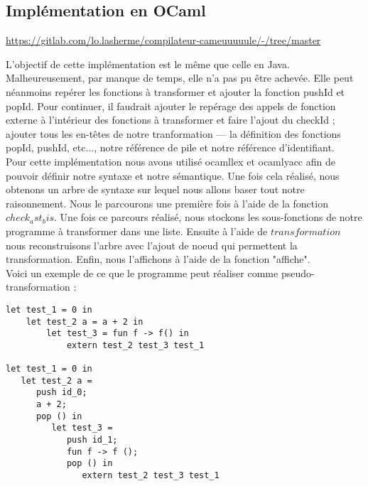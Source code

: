 \documentclass[11pt, a4paper, notitlepage]{article}
\newcommand\tab{{\hspace*{12.5mm}}}
\begin{document}
\subsection{Implémentation en OCaml}
\begin{center}
   \url{https://gitlab.com/lo.lasherme/compilateur-cameuuuuule/-/tree/master}
\end{center}

\tab L'objectif de cette implémentation est le même que celle en Java. Malheureusement, par manque de temps, elle n'a pas pu être achevée. Elle peut néanmoins repérer les fonctions à transformer et ajouter la fonction pushId et popId. Pour continuer, il faudrait ajouter le repérage des appels de fonction externe à l'intérieur des fonctions à transformer et faire l'ajout du checkId ; ajouter tous les en-têtes de notre tranformation --- la définition des fonctions popId, pushId, etc..., notre référence de pile et notre référence d'identifiant.\\
\tab Pour cette implémentation nous avons utilisé ocamllex et ocamlyacc afin de pouvoir définir notre syntaxe et notre sémantique. Une fois cela réalisé, nous obtenons un arbre de syntaxe sur lequel nous allons baser tout notre raisonnement. Nous le parcourons une première fois à l'aide de la fonction $check_ast_bis$. Une fois ce parcours réalisé, nous stockons les sous-fonctions de notre programme à transformer dans une liste. Ensuite à l'aide de $transformation$ nous reconstruisons l'arbre avec l'ajout de noeud qui permettent la transformation. Enfin, nous l'affichons à l'aide de la fonction "affiche".\\
\tab Voici un exemple de ce que le programme peut réaliser comme pseudo-transformation :
\begin{lstlisting}[language=caml]
let test_1 = 0 in
	let test_2 a = a + 2 in
		let test_3 = fun f -> f() in
			extern test_2 test_3 test_1

let test_1 = 0 in
   let test_2 a =
      push id_0;
      a + 2;
      pop () in
         let test_3 =
            push id_1;
            fun f -> f ();
            pop () in
               extern test_2 test_3 test_1
\end{lstlisting}
\end{document}
